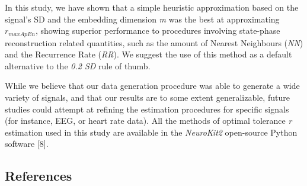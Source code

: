 \documentclass[
  man]{apa6}
\begin{document}
In this study, we have shown that a simple heuristic approximation based on the signal's SD and the embedding dimension \emph{m} was the best at approximating \(r_{maxApEn}\), showing superior performance to procedures involving state-phase reconstruction related quantities, such as the amount of Nearest Neighbours (\emph{NN}) and the Recurrence Rate (\emph{RR}). We suggest the use of this method as a default alternative to the \emph{0.2 SD} rule of thumb.

While we believe that our data generation procedure was able to generate a wide variety of signals, and that our results are to some extent generalizable, future studies could attempt at refining the estimation procedures for specific signals (for instance, EEG, or heart rate data). All the methods of optimal tolerance \emph{r} estimation used in this study are available in the \emph{NeuroKit2} open-source Python software {[}8{]}.

\newpage

\hypertarget{references}{%
\subsection{References}\label{references}}
\end{document}
